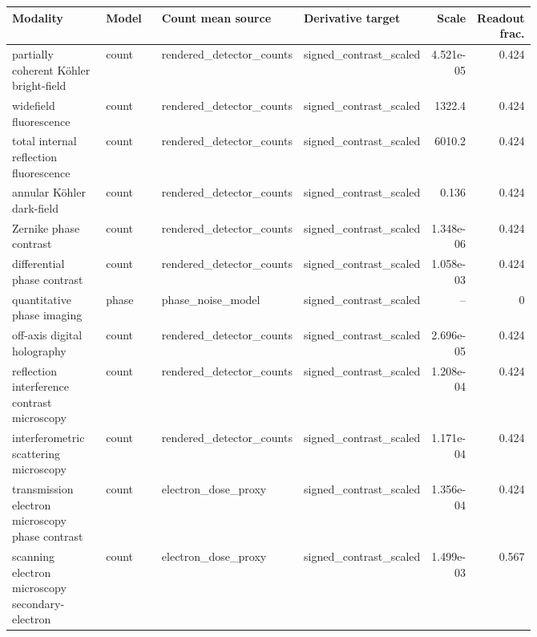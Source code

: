\begin{tabular}{p{0.23\linewidth}p{0.15\linewidth}p{0.20\linewidth}p{0.18\linewidth}rr}
\toprule
Modality & Model & Count mean source & Derivative target & Scale & Readout frac. \\
\midrule
partially coherent Köhler bright-field & count & rendered\_detector\_counts & signed\_contrast\_scaled & 4.521e-05 & 0.424 \\
widefield fluorescence & count & rendered\_detector\_counts & signed\_contrast\_scaled & 1322.4 & 0.424 \\
total internal reflection fluorescence & count & rendered\_detector\_counts & signed\_contrast\_scaled & 6010.2 & 0.424 \\
annular Köhler dark-field & count & rendered\_detector\_counts & signed\_contrast\_scaled & 0.136 & 0.424 \\
Zernike phase contrast & count & rendered\_detector\_counts & signed\_contrast\_scaled & 1.348e-06 & 0.424 \\
differential phase contrast & count & rendered\_detector\_counts & signed\_contrast\_scaled & 1.058e-03 & 0.424 \\
quantitative phase imaging & phase & phase\_noise\_model & signed\_contrast\_scaled & -- & 0 \\
off-axis digital holography & count & rendered\_detector\_counts & signed\_contrast\_scaled & 2.696e-05 & 0.424 \\
reflection interference contrast microscopy & count & rendered\_detector\_counts & signed\_contrast\_scaled & 1.208e-04 & 0.424 \\
interfero\allowbreak{}metric scattering microscopy & count & rendered\_detector\_counts & signed\_contrast\_scaled & 1.171e-04 & 0.424 \\
transmission electron microscopy phase contrast & count & electron\_dose\_proxy & signed\_contrast\_scaled & 1.356e-04 & 0.424 \\
scanning electron microscopy secondary-electron & count & electron\_dose\_proxy & signed\_contrast\_scaled & 1.499e-03 & 0.567 \\
\bottomrule
\end{tabular}

